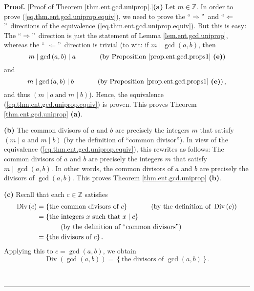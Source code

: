 \documentclass[numbers=enddot,12pt,final,onecolumn,notitlepage]{scrartcl}%
\numberwithin{exer}{subsection}
\theoremstyle{definition}
\newenvironment{proof}[1][Proof]{\noindent\textbf{#1.} }{\ \rule{0.5em}{0.5em}}
\begin{document}
\begin{proof}
[Proof of Theorem \ref{thm.ent.gcd.uniprop}.]\textbf{(a)} Let $m\in\mathbb{Z}%
$. In order to prove (\ref{eq.thm.ent.gcd.uniprop.equiv}), we need to prove
the \textquotedblleft$\Longrightarrow$\textquotedblright\ and
\textquotedblleft$\Longleftarrow$\textquotedblright\ directions of the
equivalence (\ref{eq.thm.ent.gcd.uniprop.equiv}). But this is easy: The
\textquotedblleft$\Longrightarrow$\textquotedblright\ direction is just the
statement of Lemma \ref{lem.ent.gcd.uniprop}, whereas the \textquotedblleft%
$\Longleftarrow$\textquotedblright\ direction is trivial (to wit: if
$m\mid\gcd\left(  a,b\right)  $, then
\[
m\mid\gcd\left(  a,b\right)  \mid a\ \ \ \ \ \ \ \ \ \ \left(  \text{by
Proposition \ref{prop.ent.gcd.props1} \textbf{(e)}}\right)
\]
and%
\[
m\mid\gcd\left(  a,b\right)  \mid b\ \ \ \ \ \ \ \ \ \ \left(  \text{by
Proposition \ref{prop.ent.gcd.props1} \textbf{(e)}}\right)  ,
\]
and thus $\left(  m\mid a\ \text{and }m\mid b\right)  $). Hence, the
equivalence (\ref{eq.thm.ent.gcd.uniprop.equiv}) is proven. This proves
Theorem \ref{thm.ent.gcd.uniprop} \textbf{(a)}.

\textbf{(b)} The common divisors of $a$ and $b$ are precisely the integers $m$
that satisfy $\left(  m\mid a\text{ and }m\mid b\right)  $ (by the definition
of \textquotedblleft common divisor\textquotedblright). In view of the
equivalence (\ref{eq.thm.ent.gcd.uniprop.equiv}), this rewrites as follows:
The common divisors of $a$ and $b$ are precisely the integers $m$ that satisfy
$m\mid\gcd\left(  a,b\right)  $. In other words, the common divisors of $a$
and $b$ are precisely the divisors of $\gcd\left(  a,b\right)  $. This proves
Theorem \ref{thm.ent.gcd.uniprop} \textbf{(b)}.

\textbf{(c)} Recall that each $c\in\mathbb{Z}$ satisfies%
\begin{align*}
\operatorname*{Div}\left(  c\right)   &  =\left\{  \text{the common divisors
of }c\right\}  \ \ \ \ \ \ \ \ \ \ \left(  \text{by the definition of
}\operatorname*{Div}\left(  c\right)  \right) \\
&  =\left\{  \text{the integers }x\text{ such that }x\mid c\right\} \\
&  \ \ \ \ \ \ \ \ \ \ \left(  \text{by the definition of \textquotedblleft
common divisors\textquotedblright}\right) \\
&  =\left\{  \text{the divisors of }c\right\}  .
\end{align*}
Applying this to $c=\gcd\left(  a,b\right)  $, we obtain%
\begin{equation}
\operatorname*{Div}\left(  \gcd\left(  a,b\right)  \right)  =\left\{
\text{the divisors of }\gcd\left(  a,b\right)  \right\}  .
\label{pf.thm.ent.gcd.uniprop.c.1a}%
\end{equation}



\end{proof}
\end{document}
